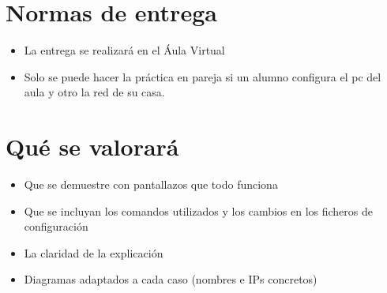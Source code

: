 \section{Normas de entrega}
\begin{itemize}
  
\item La entrega se realizará en el Áula Virtual
\item Solo se puede hacer la práctica en pareja si un alumno configura el pc del aula y otro la red de su casa.
\end{itemize}

\section{Qué se valorará}
\begin{itemize}
\item Que se demuestre con pantallazos que todo funciona
\item Que se incluyan los comandos utilizados y los cambios en los ficheros de configuración
\item La claridad de la explicación
\item Diagramas adaptados a cada caso (nombres e IPs concretos)
\end{itemize}




